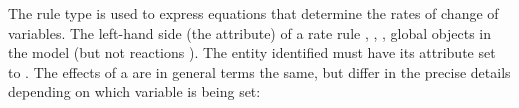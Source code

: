 \subsubsection{}
\label{sec:raterule}

The rule type \RateRule is used to express equations that
determine the rates of change of variables.  The left-hand side
(the   attribute) of a rate rule  
\Species, \SpeciesReference, \Compartment, 
 global \Parameter objects in
the model (but not reactions ).  The
entity identified must have its  attribute set to
.  The effects of a \RateRule are in general terms the
same, but differ in the precise details depending on which
variable is being set:

